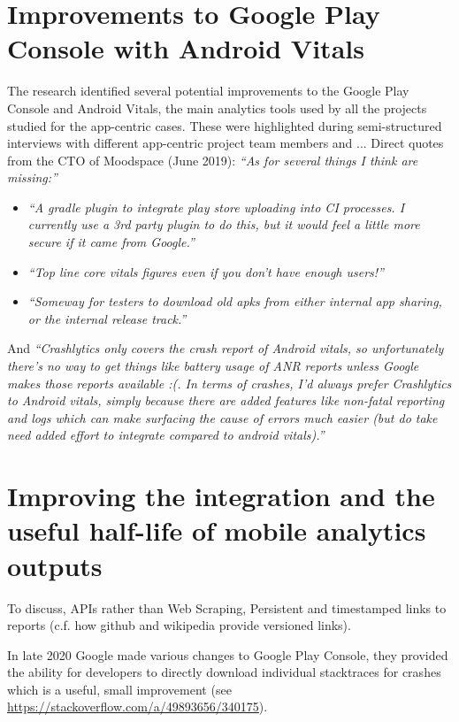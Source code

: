 \section{Improvements to Google Play Console with Android Vitals}
The research identified several potential improvements to the Google Play Console and Android Vitals, the main analytics tools used by all the projects studied for the app-centric cases. These were highlighted during semi-structured interviews with different app-centric project team members and ...
Direct quotes from the CTO of Moodspace (June 2019): \emph{``As for several things I think are missing:''}
\begin{itemize}
    \item \textit{``A gradle plugin to integrate play store uploading into CI processes. I currently use a 3rd party plugin to do this, but it would feel a little more secure if it came from Google.''}
    \item \textit{``Top line core vitals figures even if you don't have enough users!''}
    \item \textit{``Someway for testers to download old apks from either internal app sharing, or the internal release track.''}
\end{itemize}

And \emph{``Crashlytics only covers the crash report of Android vitals, so unfortunately there's no way to get things like battery usage of ANR reports unless Google makes those reports available :(. In terms of crashes, I'd always prefer Crashlytics to Android vitals, simply because there are added features like non-fatal reporting and logs which can make surfacing the cause of errors much easier (but do take need added effort to integrate compared to android vitals).''}

\section{Improving the integration and the useful half-life of mobile analytics outputs}
To discuss, APIs rather than Web Scraping, Persistent and timestamped links to reports (c.f. how github and wikipedia provide versioned links).

In late 2020 Google made various changes to Google Play Console, they provided the ability for developers to directly download individual stacktraces for crashes~\citep{stackoverflow2018_how_can_i_get_app_crash_log_from_google_play_console} which is a useful, small improvement (see \url{https://stackoverflow.com/a/49893656/340175}).

